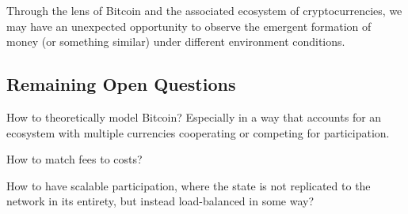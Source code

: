 Through the lens of Bitcoin and the associated ecosystem of cryptocurrencies, we may have an unexpected opportunity to observe the emergent formation of money (or something similar) under different environment conditions.


\subsection{Remaining Open Questions}

How to theoretically model Bitcoin? Especially in a way that accounts for an ecosystem with multiple currencies cooperating or competing for participation.

How to match fees to costs?

How to have scalable participation, where the state is not replicated to the network in its entirety, but instead load-balanced in some way?

